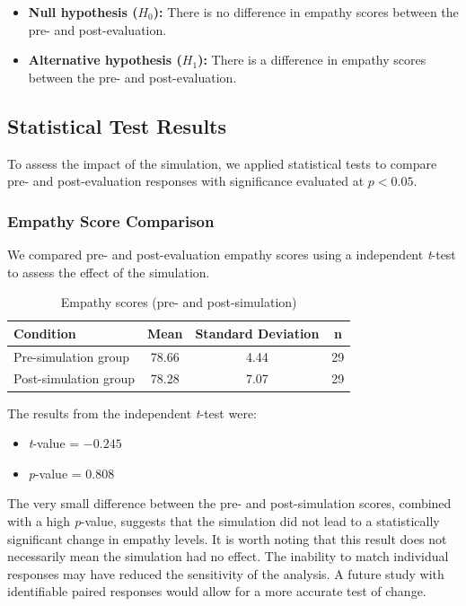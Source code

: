 \begin{itemize}
  \item \textbf{Null hypothesis ($H_0$):} There is no difference in empathy scores between the pre- and post-evaluation.
  \item \textbf{Alternative hypothesis ($H_1$):} There is a difference in empathy scores between the pre- and post-evaluation.
\end{itemize}


\subsection{Statistical Test Results}

To assess the impact of the simulation, we applied statistical tests to compare pre- and post-evaluation responses with significance evaluated at $p < 0.05$.

\subsubsection{Empathy Score Comparison}

We compared pre- and post-evaluation empathy scores using a independent \textit{t}-test to assess the effect of the simulation.

\begin{table}[htbp]
    \centering
    \caption{Empathy scores (pre- and post-simulation)}
    \begin{tabular}{|l|c|c|c|}
        \hline
        \textbf{Condition} & \textbf{Mean} & \textbf{Standard Deviation} & \textbf{n} \\
        \hline
        Pre-simulation group & 78.66 & 4.44 & 29 \\
        \hline
        Post-simulation group & 78.28 & 7.07 & 29 \\
        \hline
    \end{tabular}
    \label{tab:group_empathy_stats}
\end{table}

The results from the independent \textit{t}-test were:

\begin{itemize}
    \item \textit{t}-value = \(-0.245\)
    \item \textit{p}-value = \(0.808\)
\end{itemize}

The very small difference between the pre- and post-simulation scores, combined with a high \textit{p}-value, suggests that the simulation did not lead to a statistically significant change in empathy levels. It is worth noting that this result does not necessarily mean the simulation had no effect. The inability to match individual responses may have reduced the sensitivity of the analysis. A future study with identifiable paired responses would allow for a more accurate test of change.

